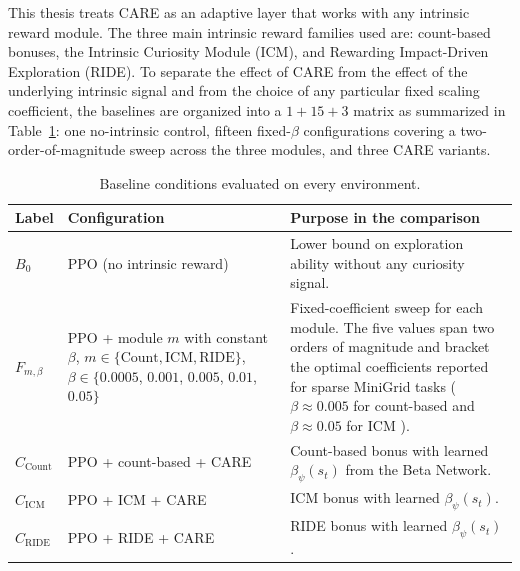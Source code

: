 This thesis treats CARE as an adaptive layer that works with any intrinsic reward module. The three main intrinsic reward families used are: count-based bonuses, the Intrinsic Curiosity Module (ICM), and Rewarding Impact-Driven Exploration (RIDE). To separate the effect of CARE from the effect of the underlying intrinsic signal and from the choice of any particular fixed scaling coefficient, the baselines are organized into a $1 + 15 + 3$ matrix as summarized in Table~\ref{tab:baselines}: one no-intrinsic control, fifteen fixed-$\beta$ configurations covering a two-order-of-magnitude sweep across the three modules, and three CARE variants.

\begin{table}[H]
\centering
\caption{Baseline conditions evaluated on every environment.}
\label{tab:baselines}
\begin{tabular}{|m{1.8cm}|m{4.4cm}|m{7.2cm}|}
\hline
\textbf{Label} & \textbf{Configuration} & \textbf{Purpose in the comparison} \\ \hline
$B_0$ & PPO (no intrinsic reward) & Lower bound on exploration ability without any curiosity signal. \\ \hline
$F_{m,\beta}$ & PPO + module $m$ with constant $\beta$, $m \in \{\text{Count}, \text{ICM}, \text{RIDE}\}$, $\beta \in \{0.0005$, $0.001$, $0.005$, $0.01$, $0.05\}$ & Fixed-coefficient sweep for each module. The five values span two orders of magnitude and bracket the optimal coefficients reported for sparse MiniGrid tasks ($\beta \approx 0.005$ for count-based and $\beta \approx 0.05$ for ICM \cite{andres2025impact}). \\ \hline
$C_\text{Count}$ & PPO + count-based + CARE & Count-based bonus with learned $\beta_\psi(s_t)$ from the Beta Network. \\ \hline
$C_\text{ICM}$ & PPO + ICM + CARE & ICM bonus with learned $\beta_\psi(s_t)$. \\ \hline
$C_\text{RIDE}$ & PPO + RIDE + CARE & RIDE bonus with learned $\beta_\psi(s_t)$. \\ \hline
\end{tabular}
\end{table}

